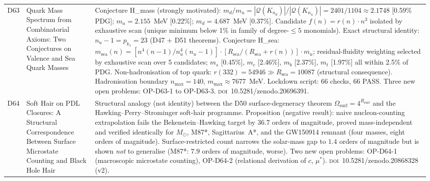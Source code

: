 \documentclass[11pt,a4paper]{article}
\theoremstyle{plain}
\theoremstyle{definition}
\theoremstyle{remark}
\newcommand{\Rsurf}{R_{\mathrm{surf}}}
\begin{document}
\begin{longtable}{L{1.3cm}L{3.8cm}L{8.0cm}}
D63 & Quark Mass Spectrum from Combinatorial Axioms: Two Conjectures on Valence and Sea Quark Masses~\cite{D63} & \textcolor{conjecturegreen}{Conjecture H\_mass} (strongly motivated): $m_d/m_u = |\mathcal{Q}(K_{n_d})|/|\mathcal{Q}(K_{n_u})| = 2401/1104 \approx 2.1748$ [0.59\% PDG]; $m_u = 2.155$~MeV [0.22\%]; $m_d = 4.687$~MeV [0.37\%]. Candidate $f(n)=r(n)\cdot n^3$ isolated by exhaustive scan (unique minimum below 1\% in family of degree-$\leq 5$ monomials). Exact structural identity: $n_u - 1 = p_{k_1} = 23$ (D47 + D51 theorems). \textcolor{conjecturegreen}{Conjecture H\_sea}: $m_{\mathrm{sea}}(n) = [n^4(n-1)/n_u^4(n_u-1)]\cdot[R_{\mathrm{sea}}/(R_{\mathrm{sea}}+r(n))]\cdot m_u$; residual-fluidity weighting selected by exhaustive scan over 5 candidates; $m_s$ [0.45\%], $m_c$ [2.46\%], $m_b$ [2.37\%], $m_t$ [1.97\%] all within 2.5\% of PDG. Non-hadronisation of top quark: $r(332)=54946 \gg R_{\mathrm{sea}}=10087$ (structural consequence). Hadronisation boundary $n_{\max}=140$, $m_{\max}\approx7677$~MeV. Lockdown script: 66 checks, 66 PASS. Three new open problems: OP-D63-1 to OP-D63-3. \textsc{doi}~10.5281/zenodo.20696391.\\[0.4em]
D64 & Soft Hair on PDL Closures: A Structural Correspondence Between Surface Microstate Counting and Black Hole Hair~\cite{D64} & Structural analogy (not identity) between the D50 surface-degeneracy theorem $\Omega_{\mathrm{surf}}=4^{\Rsurf}$ and the Hawking--Perry--Strominger soft-hair programme. \textcolor{proofblue}{Proposition (negative result)}: naive nucleon-counting extrapolation fails the Bekenstein--Hawking target by $36.7$ orders of magnitude, proved mass-independent and verified identically for $M_\odot$, M87*, Sagittarius~A*, and the GW150914 remnant (four masses, eight orders of magnitude). Surface-restricted count narrows the solar-mass gap to $1.4$ orders of magnitude but is shown \emph{not} to generalise (M87*: $7.9$ orders of magnitude, worse). Two new open problems: OP-D64-1 (macroscopic microstate counting), OP-D64-2 (relational derivation of $c$, $\mu^*$). \textsc{doi}~10.5281/zenodo.20868328 (v2).\\[0.4em]

\end{longtable}
\end{document}
